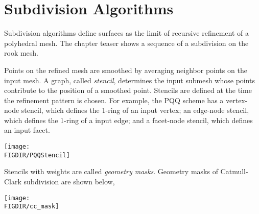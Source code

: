  



\section{Subdivision Algorithms}
Subdivision algorithms define surfaces as the limit
of recursive refinement of a polyhedral mesh. The chapter teaser
shows a sequence of a subdivision on the rook mesh.

Points on the refined mesh are smoothed by averaging
neighbor points on the input mesh. A graph, called \emph{stencil}, 
determines the input submesh whose points contribute to the 
position of a smoothed point. Stencils are defined at the time 
the refinement pattern is chosen. For example, 
the PQQ scheme has a vertex-node stencil, which defines 
the 1-ring of an input vertex; an edge-node stencil, which 
defines the 1-ring of a input edge; and a facet-node stencil,
which defines an input facet.

\begin{ccTexOnly}
  \begin{center}
    \parbox{0.5\textwidth}{%
      \texttt{[image: \\FIGDIR/PQQStencil]}%
    }
  \end{center}
\end{ccTexOnly}

Stencils with weights are called \emph{geometry masks}.
Geometry masks of Catmull-Clark subdivision are shown below,

\begin{ccTexOnly}
  \begin{center}
    \parbox{0.4\textwidth}{%
      \texttt{[image: \\FIGDIR/cc\_mask]}%
    }
  \end{center}
\end{ccTexOnly}

